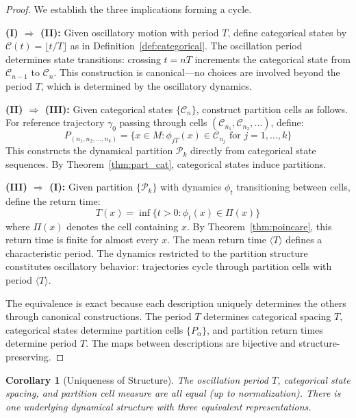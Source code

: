 \documentclass[twocolumn,10pt,a4paper]{article}
\newtheorem{corollary}[theorem]{Corollary}
\begin{document}
\begin{proof}
We establish the three implications forming a cycle.

\textbf{(I) $\Rightarrow$ (II):} Given oscillatory motion with period $T$, define categorical states by $\mathcal{C}(t) = \lfloor t/T \rfloor$ as in Definition~\ref{def:categorical}. The oscillation period determines state transitions: crossing $t = nT$ increments the categorical state from $\mathcal{C}_{n-1}$ to $\mathcal{C}_n$. This construction is canonical---no choices are involved beyond the period $T$, which is determined by the oscillatory dynamics.

\textbf{(II) $\Rightarrow$ (III):} Given categorical states $\{\mathcal{C}_n\}$, construct partition cells as follows. For reference trajectory $\gamma_0$ passing through cells $(\mathcal{C}_{n_1}, \mathcal{C}_{n_2}, \ldots)$, define:
\begin{equation}
P_{(n_1, n_2, \ldots, n_k)} = \{x \in M : \phi_{jT}(x) \in \mathcal{C}_{n_j} \text{ for } j = 1, \ldots, k\}
\end{equation}
This constructs the dynamical partition $\mathcal{P}_k$ directly from categorical state sequences. By Theorem~\ref{thm:part_cat}, categorical states induce partitions.

\textbf{(III) $\Rightarrow$ (I):} Given partition $\{\mathcal{P}_k\}$ with dynamics $\phi_t$ transitioning between cells, define the return time:
\begin{equation}
T(x) = \inf\{t > 0 : \phi_t(x) \in \Pi(x)\}
\end{equation}
where $\Pi(x)$ denotes the cell containing $x$. By Theorem~\ref{thm:poincare}, this return time is finite for almost every $x$. The mean return time $\langle T \rangle$ defines a characteristic period. The dynamics restricted to the partition structure constitutes oscillatory behavior: trajectories cycle through partition cells with period $\langle T \rangle$.

The equivalence is exact because each description uniquely determines the others through canonical constructions. The period $T$ determines categorical spacing $T$, categorical states determine partition cells $\{P_\alpha\}$, and partition return times determine period $T$. The maps between descriptions are bijective and structure-preserving.
\end{proof}

\begin{corollary}[Uniqueness of Structure]
The oscillation period $T$, categorical state spacing, and partition cell measure are all equal (up to normalization). There is one underlying dynamical structure with three equivalent representations.
\end{corollary}
\end{document}
